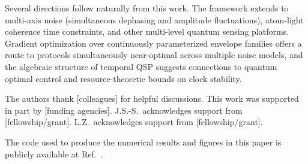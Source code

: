 \documentclass[aps,pra,twocolumn,superscriptaddress,longbibliography]{revtex4-2}
\begin{document}
Several directions follow naturally from this work.
The framework extends to multi-axis noise (simultaneous dephasing and amplitude
fluctuations), atom-light coherence time constraints, and other multi-level quantum
sensing platforms.
Gradient optimization over continuously parameterized envelope families offers a route
to protocols simultaneously near-optimal across multiple noise models, and the
algebraic structure of temporal QSP suggests connections to quantum optimal control
and resource-theoretic bounds on clock stability.

\begin{acknowledgments}
The authors thank [colleagues] for helpful discussions.
This work was supported in part by [funding agencies].
J.S.-S.\ acknowledges support from [fellowship/grant].
L.Z.\ acknowledges support from [fellowship/grant].
\end{acknowledgments}

The code used to produce the numerical results and figures in this paper is
publicly available at Ref.~\cite{filterQSP}.


\end{document}
